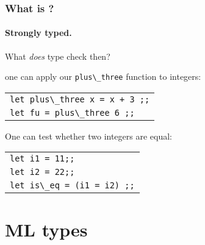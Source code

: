 \documentclass[12pt,red]{beamer}
\begin{document}
\begin{frame}
  \frametitle{What is \ML?}

  \framesubtitle{Strongly typed.}

  What \emph{does} type check then?

  one can apply our \lstinline{plus\_three} function to integers:

  \vspace*{0.05in}
  \begin{beamerboxesrounded}[shadow=true]{}
    \begin{center}
      \begin{tabular}{l}
        \lstinline{let plus\_three x = x + 3 ;;}\\
        \lstinline{let fu = plus\_three 6 ;;}
        \end{tabular}
    \end{center}
  \end{beamerboxesrounded}

  \vspace{0.2in}

  One can test whether two integers are equal:

  \vspace*{0.05in}
  \begin{beamerboxesrounded}[shadow=true]{}
    \begin{center}
      \begin{tabular}{l}
        \lstinline{let i1 = 11;;}\\
        \lstinline{let i2 = 22;;}\\
        \lstinline{let is\_eq = (i1 = i2) ;;}
      \end{tabular}
    \end{center}
  \end{beamerboxesrounded}

\end{frame}


\section{ML types}
\end{document}
